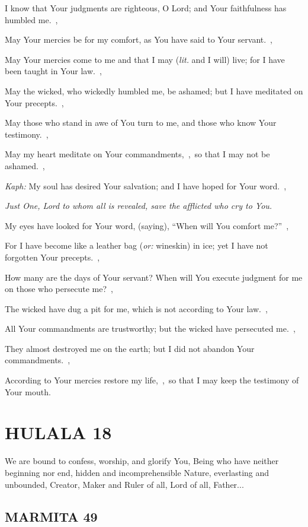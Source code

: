\documentclass[12pt,twoside,a5paper]{article}
\newcommand{\hulala}[1]{\section*{HULALA {#1}}}
\newcommand{\marmita}[1]{\subsection*{MARMITA {#1}}}
\newcommand{\qanona}[1]{{\liturgicalhint{Qanona.} \emph{#1}}}
\newcommand{\slota}[1]{\liturgicalhint{Slota.} #1}
\newcommand{\translationoption}[1]{\emph{or:} #1}
\newcommand{\translationliteral}[1]{\emph{lit.} #1}
\begin{document}
\begin{normalparskip}
  I know that Your judgments are righteous, O Lord; and Your faithfulness has humbled me.~\sep

  May Your mercies be for my comfort, as You have said to Your servant.~\sep

  May Your mercies come to me and that I may (\translationliteral{and I will}) live; for I have been taught in Your law.~\sep

  May the wicked, who wickedly humbled me, be ashamed; but I have meditated on Your precepts.~\sep

  May those who stand in awe of You turn to me, and those who know Your testimony.~\sep

  May my heart meditate on Your commandments,~\sep\ so that I may not be ashamed.~\sep

  \emph{Kaph:} My soul has desired Your salvation; and I have hoped for Your word.~\sep

  \qanona{Just One, Lord to whom all is revealed, save the afflicted who cry to You.}

  My eyes have looked for Your word, (saying), ``When will You comfort me?''~\sep

  For I have become like a leather bag (\translationoption{wineskin}) in ice; yet I have not forgotten Your precepts.~\sep

  How many are the days of Your servant? When will You execute judgment for me on those who persecute me?~\sep

  The wicked have dug a pit for me, which is not according to Your law.~\sep

  All Your commandments are trustworthy; but the wicked have persecuted me.~\sep

  They almost destroyed me on the earth; but I did not abandon Your commandments.~\sep

  According to Your mercies restore my life,~\sep\ so that I may keep the testimony of Your mouth.
\end{normalparskip}


\hulala{18}

\slota{We are bound to confess, worship, and glorify You, Being who have neither beginning nor end, hidden and incomprehensible Nature, everlasting and unbounded, Creator, Maker and Ruler of all, Lord of all, Father...}

\marmita{49}
\end{document}
